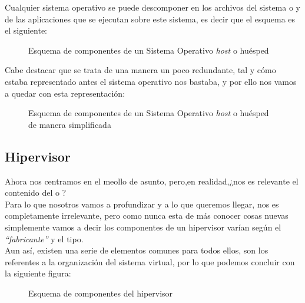 Cualquier sistema operativo se puede descomponer en los archivos del sistema o \emph{} y de las aplicaciones que se ejecutan sobre este sistema, es decir que el esquema es el siguiente:

\begin{figure}[H]
\begin{center}
\end{center}
\caption[Sistema Operativo huésped]{Esquema de componentes de un Sistema Operativo \emph{host} o huésped}
\end{figure}

Cabe destacar que se trata de una manera un poco redundante, tal y cómo estaba representado antes el sistema operativo nos bastaba, y por ello nos vamos a quedar con esta representación:

\begin{figure}[H]
\begin{center}
\end{center}
\caption[Sistema Operativo huésped simplificado]{Esquema de componentes de un Sistema Operativo \emph{host} o huésped de manera simplificada}
\end{figure}

\subsection{Hipervisor}
Ahora nos centramos en el meollo de asunto, pero,en realidad,¿nos es relevante el contenido del  o ?\\

Para lo que nosotros vamos a profundizar y a lo que queremos llegar, nos es completamente irrelevante, pero como nunca esta de más conocer cosas nuevas simplemente vamos a decir los componentes de un hipervisor varían según el \emph{\textquotedblleft fabricante\textquotedblright} y el tipo.\\

Aun así, existen una serie de elementos comunes para todos ellos, son los referentes a la organización del sistema virtual, por lo que podemos concluir con la siguiente figura:

\begin{figure}[H]
\begin{center}
\end{center}
\caption[Componentes hipervisor]{Esquema de componentes del hipervisor}
\end{figure}

